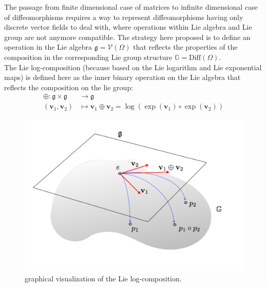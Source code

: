 The passage from finite dimensional case of matrices to infinite dimensional case of diffeomorphisms requires a way to represent diffeomorphisms having only discrete vector fields to deal with, where operations within Lie algebra and Lie group are not anymore compatible. The strategy here proposed is to define an operation in the Lie algebra $\mathfrak{g} = \mathcal{V}(\Omega)$ that reflects the properties of the composition in the corresponding Lie group structure $\mathbb{G} = \text{Diff}(\Omega)$.\\

The Lie log-composition (because based on the Lie logarithm and Lie exponential maps) is defined here as the inner binary operation on the Lie algebra that reflects the composition on the lie group:
\begin{align}\label{eq:main_def_log_composition}
\oplus : \mathfrak{g} \times \mathfrak{g} & \longrightarrow \mathfrak{g}    \\
(\mathbf{v}_{1}, \mathbf{v}_{2}) &\longmapsto \mathbf{v}_{1}\oplus \mathbf{v}_{2} =  \log(\exp(\mathbf{v}_1)\circ \exp(\mathbf{v}_2))
\end{align}

\begin{figure}[!ht]
	\centering
	\includegraphics[scale=0.35]{figures/log_composition.png}
	\caption{graphical visualization of the Lie log-composition.}
	\label{fig:composition}
\end{figure}

